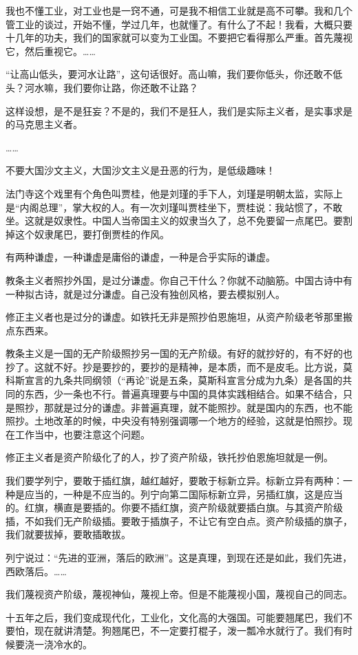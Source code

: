 我也不懂工业，对工业也是一窍不通，可是我不相信工业就是高不可攀。我和几个管工业的谈过，开始不懂，学过几年，也就懂了。有什么了不起！我看，大概只要十几年的功夫，我们的国家就可以变为工业国。不要把它看得那么严重。首先蔑视它，然后重视它。……

“让高山低头，要河水让路”，这句话很好。高山嘛，我们要你低头，你还敢不低头？河水嘛，我们要你让路，你还敢不让路？

这样设想，是不是狂妄？不是的，我们不是狂人，我们是实际主义者，是实事求是的马克思主义者。

……

不要大国沙文主义，大国沙文主义是丑恶的行为，是低级趣味！

法门寺这个戏里有个角色叫贾桂，他是刘瑾的手下人，刘瑾是明朝太监，实际上是“内阁总理”，掌大权的人。有一次刘瑾叫贾桂坐下，贾桂说：我站惯了，不敢坐。这就是奴隶性。中国人当帝国主义的奴隶当久了，总不免要留一点尾巴。要割掉这个奴隶尾巴，要打倒贾桂的作风。

有两种谦虚，一种谦虚是庸俗的谦虚，一种是合乎实际的谦虚。

教条主义者照抄外国，是过分谦虚。你自己干什么？你就不动脑筋。中国古诗中有一种拟古诗，就是过分谦虚。自己没有独创风格，要去模拟别人。

修正主义者也是过分的谦虚。如铁托无非是照抄伯恩施坦，从资产阶级老爷那里搬点东西来。

教条主义是一国的无产阶级照抄另一国的无产阶级。有好的就抄好的，有不好的也抄了。这就不好。抄是要抄的，要抄的是精神，是本质，而不是皮毛。比方说，莫科斯宣言的九条共同纲领（“再论”说是五条，莫斯科宣言分成为九条）是各国的共同的东西，少一条也不行。普遍真理要与中国的具体实践相结合。如果不结合，只是照抄，那就是过分的谦虚。非普遍真理，就不能照抄。就是国内的东西，也不能照抄。土地改革的时候，中央没有特别强调哪一个地方的经验，这就是怕照抄。现在工作当中，也要注意这个问题。

修正主义者是资产阶级化了的人，抄了资产阶级，铁托抄伯恩施坦就是一例。

我们要学列宁，要敢于插红旗，越红越好，要敢于标新立异。标新立异有两种：一种是应当的，一种是不应当的。列宁向第二国际标新立异，另插红旗，这是应当的。红旗，横直是要插的。你要不插红旗，资产阶级就要插白旗。与其资产阶级插，不如我们无产阶级插。要敢于插旗子，不让它有空白点。资产阶级插的旗子，我们就要拔掉，要敢插敢拔。

列宁说过：“先进的亚洲，落后的欧洲”。这是真理，到现在还是如此，我们先进，西欧落后。……

我们蔑视资产阶级，蔑视神仙，蔑视上帝。但是不能蔑视小国，蔑视自己的同志。

十五年之后，我们变成现代化，工业化，文化高的大强国。可能要翘尾巴，我们不要怕，现在就讲清楚。狗翘尾巴，不一定要打棍子，泼一瓢冷水就行了。我们有时候要浇一浇冷水的。

